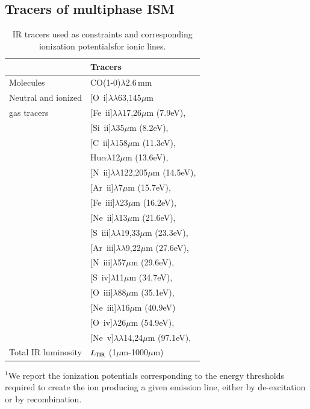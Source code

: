 \documentclass{aa}
\newcommand{\nii}{[N~{\sc ii}]}
\newcommand{\niii}{[N~{\sc iii}]}
\newcommand{\oi}{[O~{\sc i}]}
\newcommand{\oiii}{[O~{\sc iii}]}
\newcommand{\oiv}{[O~{\sc iv}]}
\newcommand{\siii}{[S~{\sc iii}]}
\newcommand{\siv}{[S~{\sc iv}]}
\newcommand{\cii}{[C~{\sc ii}]}
\newcommand{\neiii}{[Ne~{\sc iii}]}
\newcommand{\neii}{[Ne~{\sc ii}]}
\newcommand{\nev}{[Ne~{\sc v}]}
\newcommand{\feii}{[Fe~{\sc ii}]}
\newcommand{\feiii}{[Fe~{\sc iii}]}
\newcommand{\silii}{[Si~{\sc ii}]}
\newcommand{\arii}{[Ar~{\sc ii}]}
\newcommand{\ariii}{[Ar~{\sc iii}]}
\begin{document}
\subsection{Tracers of multiphase ISM}
\label{sect_tracer_ism}
\begin{table}[t]
    \centering
    \caption{IR tracers used as constraints and corresponding ionization potentials\protect\footnotemark[1] for ionic lines.}
    \begin{tabular}{p{}p{}}
         & Tracers \\
        \hline
        \hline
        Molecules & CO(1-0)$\lambda$2.6\,mm \\
        Neutral and ionized & \oi$\lambda\lambda$63,145$\mu$m\\
        gas tracers & \feii$\lambda\lambda$17,26$\mu$m (7.9eV), \\
         & \silii$\lambda$35$\mu$m (8.2eV),\\
         & \cii$\lambda$158$\mu$m (11.3eV),\\  
         & Hu$\alpha \lambda$12$\mu$m (13.6eV),\\
         & \nii$\lambda\lambda$122,205$\mu$m (14.5eV),\\
         & \arii$\lambda$7$\mu$m (15.7eV),\\
         & \feiii$\lambda$23$\mu$m (16.2eV),\\
         & \neii$\lambda$13$\mu$m (21.6eV),\\
         & \siii$\lambda\lambda$19,33$\mu$m (23.3eV),\\
         & \ariii$\lambda\lambda$9,22$\mu$m (27.6eV),\\
         & \niii$\lambda$57$\mu$m (29.6eV), \\
         & \siv$\lambda$11$\mu$m (34.7eV),\\
         & \oiii$\lambda$88$\mu$m (35.1eV), \\
         & \neiii$\lambda$16$\mu$m (40.9eV)\\
         &\oiv$\lambda$26$\mu$m (54.9eV),\\ 
         & \nev$\lambda\lambda$14,24$\mu$m (97.1eV), \\
         Total IR luminosity & $L_{\rm TIR}$ (1$\mu$m-1000$\mu$m) \\
         \hline
    \end{tabular}
    \begin{tablenotes}
    \footnotesize
    \item $^1$We report the ionization potentials corresponding to the energy thresholds required to create the ion producing a given emission line, either by de-excitation or by recombination.
    \end{tablenotes}
    \label{tracers}
\end{table}
\end{document}

